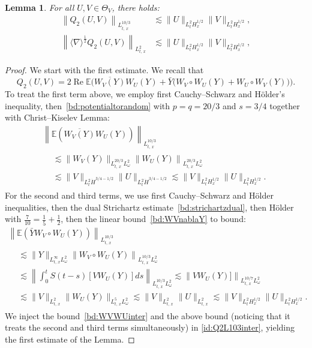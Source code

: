 \documentclass[10pt]{amsart}
\newtheorem{lemm}[theo]{Lemma}\newtheorem{prop}[theo]{Proposition}\newtheorem{coro}[theo]{Corollary}\newtheorem{conj}[theo]{Conjecture}
\theoremstyle{definition}\newtheorem{defi}[theo]{Definition}\newtheorem{rema}[theo]{Remark}\newtheorem{exam}[theo]{Example}\newtheorem{exem}[theo]{Example}\newtheorem{nota}[theo]{Notation}
\newcommand{\E}{\mathbb{E}}
\DeclareMathOperator{\Rel}{Re}
\begin{document}
\begin{lemm}\label{prop:QuadV2.1}
For all $U,V\in \Theta_V$, there holds:
\begin{align*}
\left\|Q_2(U,V)\right\|_{L^{10/3}_{t,\,x}} &\lesssim \|U\|_{L^2_tH^{1/2}_{x}} \|V\|_{L^2_tH^{1/2}_{x}}, \\
\left\| \langle \nabla \rangle^{\frac 12} Q_2(U,V)\right\|_{L^{2}_{t,\,x}} &\lesssim \|U\|_{L^2_{t}H^{1/2}_x} \|V\|_{L^2_{t}H^{1/2}_x},
\end{align*}
\end{lemm}

\begin{proof}
We start with the first estimate. We recall that
\begin{equation} \label{id:Q2L103inter}
Q_2(U,V) = 2\Rel \E \Big(\overline{W_V(Y)}W_U(Y) + \bar Y\big(W_V\circ W_U(Y) + W_U\circ W_V(Y)\big)\Big).
\end{equation}
To treat the first term above, we employ first Cauchy--Schwarz and H\"older's inequality, then~\eqref{bd:potentialtorandom} with $p=q=20/3$ and $s=3/4$ together with Christ--Kiselev Lemma:
\begin{multline}\label{bd:WVWUinter}
\left\| \E\left(\overline{W_V(Y)}W_U(Y)\right)\right\|_{L^{10/3}_{t,\,x}}\\
\begin{aligned}
&\lesssim \| W_V(Y)\|_{L^{20/3}_{t,\,x}L^2_\omega} \left\| W_U(Y) \right\|_{L^{20/3}_{t,\,x}L^2_\omega}\\
&\lesssim \| V \|_{L^2_{t}\dot H^{3/4-1/2}} \| U \|_{L^2_{t}\dot H^{3/4-1/2}}\lesssim \| V \|_{L^2_{t}H^{1/2}_x} \| U \|_{L^2_{t}H^{1/2}_x}.
\end{aligned}
\end{multline}
For the second and third terms, we use first Cauchy--Schwarz and H\"older inequalities, then the dual Strichartz estimate~\eqref{bd:strichartzdual}, then H\"older with $\tfrac7{10} = \tfrac1{5} + \tfrac1{2}$, then the linear bound~\eqref{bd:WVnablaY} to bound:
\begin{multline*}
\left\| \E\left(\bar Y W_V\circ W_U(Y)\right)\right\|_{L^{10/3}_{t,\,x}}\\
\begin{aligned}
&\lesssim \| Y\|_{L^{\infty}_{t,\,x}L^2_\omega}\left\| W_V\circ W_U(Y)\right\|_{L^{10/3}_{t,\,x}L^2_\omega}\\
&\lesssim \left\| \int_0^t S(t-s)\left[V W_U(Y)\right] ds\right\|_{L^{10/3}_{t,\,x}L^2_\omega}\lesssim \left\| V W_U(Y)] \right\|_{L^{10/7}_{t,\,x}L^2_\omega}\\
& \lesssim \| V \|_{L^2_{t,\,x}} \|W_U(Y) \|_{L^{5}_{t,\,x}L^2_\omega}\lesssim \| V \|_{L^2_{t,\,x}} \| U \|_{L^{2}_{t,\,x}}\lesssim \| V \|_{L^2_{t}H^{1/2}_x} \| U \|_{L^{2}_{t}H^{1/2}_x}.
\end{aligned}
\end{multline*}
 We inject the bound~\eqref{bd:WVWUinter} and the above bound (noticing that it treats the second and third terms simultaneously) in \eqref{id:Q2L103inter}, yielding the first estimate of the Lemma.


\end{proof}
\end{document}
